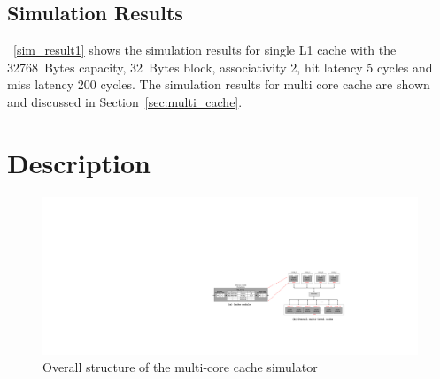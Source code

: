 \documentclass[12pt]{report}
\newcommand{\Tbl}[1]{\tablename~\ref{#1}}
\newcommand{\Sec}[1]{Section~\ref{#1}}
\begin{document}
\subsection{Simulation Results}

\begin{table}[!h]
\centering  %
\caption{Simulaion results for the single cache} %
\label{sim_result1} %
\end{table}

\Tbl{sim_result1} shows the simulation results for single L1 cache with the 32768~Bytes capacity, 32~Bytes block, associativity 2, hit latency 5 cycles and miss latency 200 cycles. The simulation results for multi core cache are shown and discussed in \Sec{sec:multi_cache}.



\newpage
\section{Description}
\begin{figure}[!h]
\begin{minipage}[b]{\textwidth}
 \centering
 \includegraphics[trim=0mm 0mm 0mm 0mm,clip,width=0.98\linewidth]{figs/cache_structure.pdf}
 \caption{Overall structure of the multi-core cache simulator}
 \label{fig:cache_structure}
\end{minipage}
\end{figure}
\end{document}
